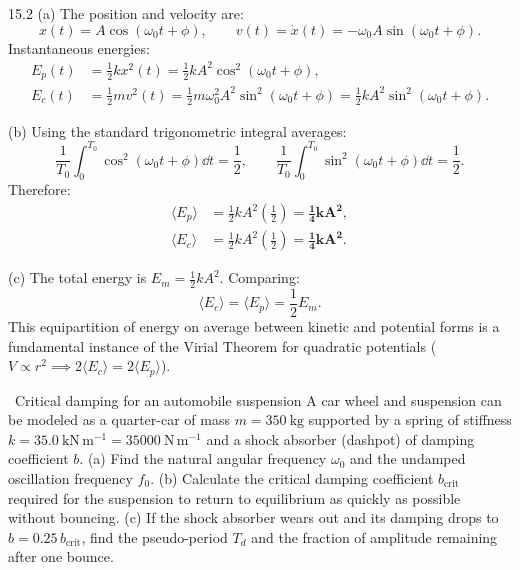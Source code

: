 \begin{solution}{15.2}
(a) The position and velocity are:
\[
x(t) = A\cos(\omega_0 t + \phi), \qquad v(t) = \dot{x}(t) = -\omega_0 A\sin(\omega_0 t + \phi).
\]
Instantaneous energies:
\begin{align*}
E_p(t) &= \frac{1}{2}k x^2(t) = \frac{1}{2}k A^2\cos^2(\omega_0 t + \phi), \\
E_c(t) &= \frac{1}{2}m v^2(t) = \frac{1}{2}m\omega_0^2 A^2\sin^2(\omega_0 t + \phi) = \frac{1}{2}k A^2\sin^2(\omega_0 t + \phi).
\end{align*}

(b) Using the standard trigonometric integral averages:
\[
\frac{1}{T_0}\int_0^{T_0} \cos^2(\omega_0 t + \phi)\dd t = \frac{1}{2}, \qquad \frac{1}{T_0}\int_0^{T_0} \sin^2(\omega_0 t + \phi)\dd t = \frac{1}{2}.
\]
Therefore:
\begin{align*}
\langle E_p \rangle &= \frac{1}{2}k A^2\left(\frac{1}{2}\right) = \mathbf{\frac{1}{4}k A^2,} \\
\langle E_c \rangle &= \frac{1}{2}k A^2\left(\frac{1}{2}\right) = \mathbf{\frac{1}{4}k A^2.}
\end{align*}

(c) The total energy is $E_m = \frac{1}{2}k A^2$.
Comparing:
\[
\boxed{\langle E_c \rangle = \langle E_p \rangle = \frac{1}{2}E_m.}
\]
This equipartition of energy on average between kinetic and potential forms is a fundamental instance of the Virial Theorem for quadratic potentials ($V \propto r^2 \implies 2\langle E_c \rangle = 2\langle E_p \rangle$).
\end{solution}

\begin{exercise}{\core\ Critical damping for an automobile suspension}
A car wheel and suspension can be modeled as a quarter-car of mass $m=350\ \mathrm{kg}$ supported by a spring of stiffness $k=35.0\ \mathrm{kN\,m^{-1}} = 35000\ \mathrm{N\,m^{-1}}$ and a shock absorber (dashpot) of damping coefficient $b$.
(a) Find the natural angular frequency $\omega_0$ and the undamped oscillation frequency $f_0$.
(b) Calculate the critical damping coefficient $b_{\text{crit}}$ required for the suspension to return to equilibrium as quickly as possible without bouncing.
(c) If the shock absorber wears out and its damping drops to $b = 0.25\,b_{\text{crit}}$, find the pseudo-period $T_d$ and the fraction of amplitude remaining after one bounce.
\end{exercise}

\begin{tabletworkspace}[5.5cm]
\end{tabletworkspace}

